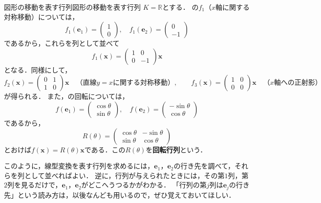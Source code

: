 \begin{example}{図形の移動を表す行列}{図形の移動を表す行列}
  $K = \mathbb{R}$とする．
  の$f_1$（$x$軸に関する対称移動）については，
  \[
    f_1(\bm{e}_1) = \begin{pmatrix} 1 \\ 0 \end{pmatrix}, \quad
    f_1(\bm{e}_2) = \begin{pmatrix} 0 \\ -1 \end{pmatrix}
  \]
  であるから，これらを列として並べて
  \[
    f_1(\bm{x}) = \begin{pmatrix} 1 & 0 \\ 0 & -1 \end{pmatrix} \bm{x}
  \]
  となる．同様にして，
  \[
    f_2(\bm{x}) = \begin{pmatrix} 0 & 1 \\ 1 & 0 \end{pmatrix} \bm{x}
    \quad \text{（直線$y = x$に関する対称移動）}, \qquad
    f_3(\bm{x}) = \begin{pmatrix} 1 & 0 \\ 0 & 0 \end{pmatrix} \bm{x}
    \quad \text{（$x$軸への正射影）}
  \]
  が得られる．
  また，の回転については，
  \[
    f(\bm{e}_1) = \begin{pmatrix} \cos\theta \\ \sin\theta \end{pmatrix}, \quad
    f(\bm{e}_2) = \begin{pmatrix} -\sin\theta \\ \cos\theta \end{pmatrix}
  \]
  であるから，
  \[
    R(\theta) = \begin{pmatrix} \cos\theta & -\sin\theta \\ \sin\theta & \cos\theta \end{pmatrix}
  \]
  とおけば$f(\bm{x}) = R(\theta)\bm{x}$である．この$R(\theta)$を\textbf{回転行列}という．
\end{example}

このように，線型変換を表す行列を求めるには，$\bm{e}_1$，$\bm{e}_2$の行き先を調べて，それらを列として並べればよい．
逆に，行列が与えられたときには，その第$1$列，第$2$列を見るだけで，$\bm{e}_1$，$\bm{e}_2$がどこへうつるかがわかる．
「行列の第$j$列は$\bm{e}_j$の行き先」という読み方は，以後なんども用いるので，ぜひ覚えておいてほしい．

